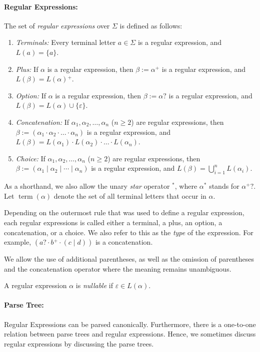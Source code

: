 \documentclass[a4paper,11pt, svgnames,titlepage]{article}
\newcommand{\rxp}{{^\mathtt{+}}}
\newcommand{\rxs}{{^\mathtt{*}}}
\newcommand{\rxo}{\mathtt{?}}
\newcommand{\rxc}{\cdot}
\DeclareMathOperator{\ror}{\mathtt{|}}
\newcommand{\emptyword}{\varepsilon}
\newcommand{\df}{:=}
\DeclareMathOperator{\term}{term}
\begin{document}
\paragraph{Regular Expressions:} The set of \emph{regular expressions} over $\Sigma$ is defined as follows:
\begin{enumerate}
	\item \emph{Terminals:} Every terminal letter $a\in \Sigma$ is a regular expression, and $L(a)=\{a\}$.
	\item \emph{Plus:} If $\alpha$ is a regular expression, then $\beta\df\alpha\rxp$ is a regular expression, and $L(\beta)=L(\alpha)\rxp$.
	\item \emph{Option:} If $\alpha$ is a regular expression, then $\beta\df\alpha\rxo$ is a regular expression, and $L(\beta)=L(\alpha)\cup\{\emptyword\}$.
	\item \emph{Concatenation:} If $\alpha_1,\alpha_2,\ldots,\alpha_n$ ($n\geq 2$) are regular expressions, then $\beta\df(\alpha_1\rxc \alpha_2 \rxc \ldots \rxc \alpha_n)$ is a regular expression, and $L(\beta)=L(\alpha_1)\cdot L(\alpha_2)\cdot \ldots \cdot L(\alpha_n)$.
	\item \emph{Choice:} If $\alpha_1,\alpha_2,\ldots,\alpha_n$ ($n\geq 2$) are regular expressions, then $\beta\df(\alpha_1\ror \alpha_2 \ror \cdots \ror \alpha_n)$ is a regular expression, and $L(\beta)=\bigcup_{i=1}^{n} L(\alpha_i)$.
\end{enumerate}
As a shorthand, we also allow the unary \emph{star} operator $\rxs$, where $\alpha\rxs$ stands for $\alpha\rxp\rxo$. Let $\term(\alpha)$ denote the set of all terminal letters that occur in $\alpha$.

Depending on the outermost rule that was used to define a regular expression, each regular expressions is called either a terminal, a plus, an option, a concatenation, or a choice. We also refer to this as the \emph{type} of the expression. For example, $(a\rxo \rxc b\rxp \rxc (c\ror d))$ is a concatenation.

We allow the use of additional parentheses, as well as the omission of parentheses and the concatenation operator where the meaning remains unambiguous.

A regular expression $\alpha$ is \emph{nullable} if $\emptyword\in L(\alpha)$.

\paragraph{Parse Tree:} Regular Expressions can be parsed canonically. Furthermore, there is a one-to-one relation between parse trees and regular expressions. Hence, we sometimes discuss regular expressions by discussing the parse trees.
\end{document}
